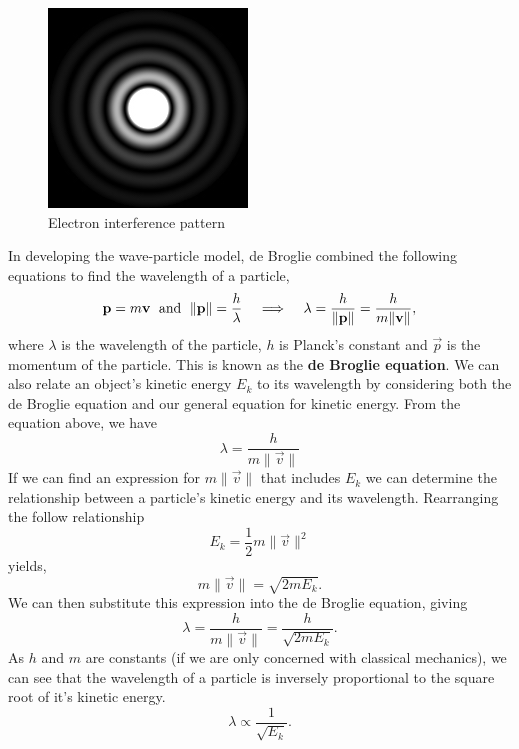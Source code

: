 \begin{figure}[h!]
    \centering
    \includegraphics{notes/images/Electron-Diffraction.JPG}
    \caption{Electron interference pattern}
    \label{fig:electron-interference}
\end{figure}
\FloatBarrier


In developing the wave-particle model, de Broglie combined the following equations to find the wavelength of a particle, 
\begin{equation}
    \vec{p} = m \vec{v} \hspace{1mm} \text{   and   } \hspace{1mm} \| \vec{p} \| = \frac{h}{\lambda} \hspace{0.3cm} \implies \hspace{0.3cm} \lambda = \frac{h}{\| \vec{p} \|} = \frac{h}{m \| \vec{v} \|},
\end{equation}
where $\lambda$ is the wavelength of the particle, $h$ is Planck's constant and $\vec{p}$ is the momentum of the particle. This is known as the \textbf{de Broglie equation}. We can also relate an object's kinetic energy $E_k$ to its wavelength by considering both the de Broglie equation and our general equation for kinetic energy. From the equation above, we have
\begin{equation}
    \lambda = \frac{h}{m \| \vec{v} \|}
\end{equation}
If we can find an expression for $m \| \vec{v} \|$ that includes $E_k$ we can determine the relationship between a particle's kinetic energy and its wavelength. Rearranging the follow relationship
\begin{equation*}
    E_k = \frac{1}{2} m \| \vec{v} \|^2
\end{equation*}
yields, 
\begin{equation}
    m \| \vec{v} \| = \sqrt{2mE_k}.
\end{equation}
We can then substitute this expression into the de Broglie equation, giving
\begin{equation*}
    \lambda = \frac{h}{m \| \vec{v} \|} = \frac{h}{\sqrt{2mE_k}}.
\end{equation*}
As $h$ and $m$ are constants (if we are only concerned with classical mechanics), we can see that the wavelength of a particle is inversely proportional to the square root of it's kinetic energy.
\begin{equation*}
    \lambda \propto \frac{1}{\sqrt{E_k}}.
\end{equation*}

